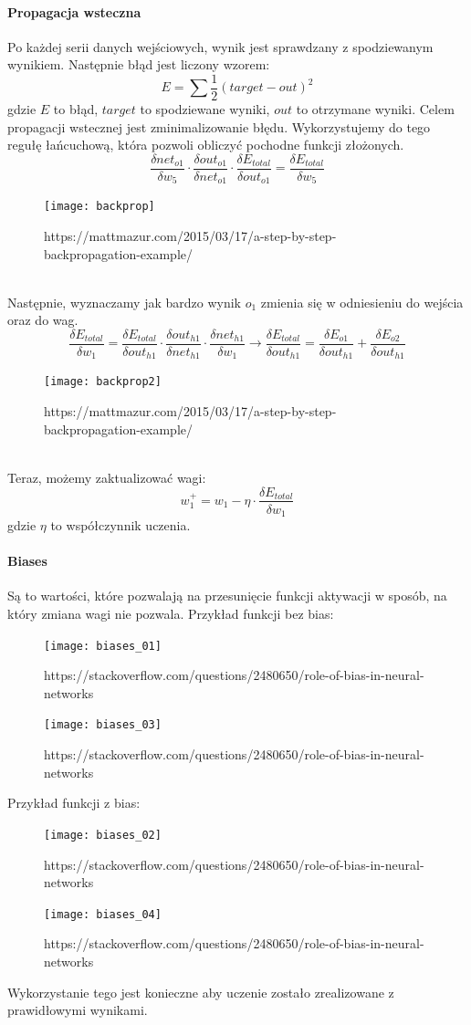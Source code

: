 \documentclass[12pt,a4paper]{article}
\begin{document}
\paragraph*{Propagacja wsteczna} 
Po każdej serii danych wejściowych, wynik jest sprawdzany z spodziewanym wynikiem. Następnie błąd jest liczony wzorem:
$$ E = \sum{\frac{1}{2}(target - out)^2} $$
gdzie $E$ to błąd, $target$ to spodziewane wyniki, $out$ to otrzymane wyniki.
Celem propagacji wstecznej jest zminimalizowanie błędu. Wykorzystujemy do tego regułę łańcuchową, która pozwoli obliczyć pochodne funkcji złożonych.
$$ \frac{\delta net_{o1}}{\delta w_5} \cdot \frac{\delta out_{o1}}{\delta net_{o1}} \cdot \frac{\delta E_{total}}{\delta out_{o1}} = \frac{\delta E_{total}}{\delta w_5} $$
\begin{figure}[hp]
\centering
\texttt{[image: backprop]}
\caption{https://mattmazur.com/2015/03/17/a-step-by-step-backpropagation-example/}
\end{figure}\\
Następnie, wyznaczamy jak bardzo wynik $o_1$ zmienia się w odniesieniu do wejścia oraz do wag. 
$$ \frac{\delta E_{total}}{\delta w_1}  = \frac{\delta E_{total}}{\delta out_{h1}} \cdot \frac{\delta out_{h1}}{\delta net_{h1}} \cdot \frac{\delta net_{h1}}{\delta w_1} \longrightarrow \frac{\delta E_{total}}{\delta out_{h1}} = \frac{\delta E_{o1}}{\delta out_{h1}} + \frac{\delta E_{o2}}{\delta out_{h1}}$$
\begin{figure}[h]
\centering
\texttt{[image: backprop2]}
\caption{https://mattmazur.com/2015/03/17/a-step-by-step-backpropagation-example/}
\end{figure}\\
Teraz, możemy zaktualizować wagi:
$$ w_1^+ = w_1 - \eta \cdot \frac{\delta E_{total}}{\delta w_1}  $$
gdzie $\eta$ to współczynnik uczenia.
\paragraph*{Biases} Są to wartości, które pozwalają na przesunięcie funkcji aktywacji w sposób, na który zmiana wagi nie pozwala. Przykład funkcji bez bias:
\begin{figure}[H]
\centering
\texttt{[image: biases\_01]}
\caption{https://stackoverflow.com/questions/2480650/role-of-bias-in-neural-networks}
\end{figure}
\begin{figure}[H]
\centering
\texttt{[image: biases\_03]}
\caption{https://stackoverflow.com/questions/2480650/role-of-bias-in-neural-networks}
\end{figure}\clearpage
Przykład funkcji z bias:
\begin{figure}[H]
\centering
\texttt{[image: biases\_02]}
\caption{https://stackoverflow.com/questions/2480650/role-of-bias-in-neural-networks}
\end{figure}
\begin{figure}[H]
\centering
\texttt{[image: biases\_04]}
\caption{https://stackoverflow.com/questions/2480650/role-of-bias-in-neural-networks}
\end{figure}
Wykorzystanie tego jest konieczne aby uczenie zostało zrealizowane z prawidłowymi wynikami.
\end{document}
